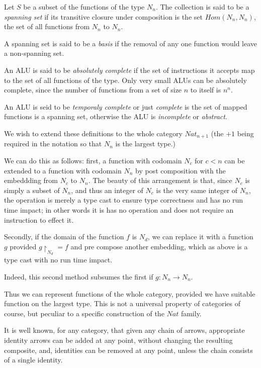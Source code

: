 \documentclass[oneside]{book}
\theoremstyle{plain}
\theoremstyle{definition}
\theoremstyle{plain}
\def\Nat{\mathit{Nat}}
\def\Hom{\mathit{Hom}}
\begin{document}
Let $S$ be a subset of the functions of the type $N_n$.
The collection is said to be a {\em spanning set} if its transitive 
closure under composition is the set $\Hom(N_n,N_n)$, the set of all functions
from $N_n$ to $N_n$.

A spanning set is said to be a {\em basis} if the removal
of any one function would leave a non-spanning set.

An ALU is said to be {\em absolutely complete} if the set of instructions
it accepts map to the set of all functions of the type.
Only very small ALUs can be absolutely complete, since the number of
functions from a set of size $n$ to itself is $n^n$.

An ALU is seid to be {\em temporaly complete} or just {\em complete}
is the set of mapped functions is a spanning set, otherwise the
ALU is {\em incomplete} or {\em abstract}.

We wish to extend these definitions to the whole category $\Nat_{n+1}$
(the $+1$ being required in the notation so that $N_n$ is the largest type.)

We can do this as follows: first, a function with codomain $N_c$ for $c<n$
can be extended to a function with codomain $N_n$ by post composition with
the embeddding from $N_c$ to $N_n$. The beauty of this arrangement is that,
since $N_c$ is simply a subset of $N_n$, and thus an integer of $N_c$ is the
very same integer of $N_n$, the operation is merely a type cast to ensure
type correctness and has no run time impact; in other words it is has
no operation and does not require an instruction to effect it.

Secondly, if the domain of the function $f$ is $N_d$, we can replace
it with a function $g$ provided $g\restriction_{N_d}=f$ and pre
compose another embedding, which as above is a type cast with no
run time impact.

Indeed, this second method subsumes the first if $g:N_n\rightarrow N_n$.

Thus we can represent functions of the whole category, 
provided we have suitable function on the largest type.
This is not a universal property of categories of course,
but peculiar to a specific construction of the $\Nat$ family.

It is well known, for any category, that given any chain of arrows,
appropriate identity arrows can be added at any point, without changing
the resulting composite, and, identities can be removed at any point,
unless the chain consists of a single identity.
\end{document}
